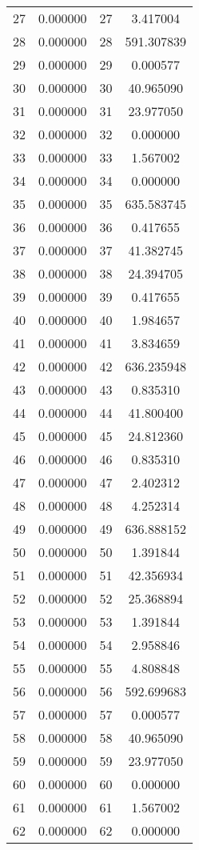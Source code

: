\documentclass[12pt]{article}
\begin{document}
\begin{longtable}{@{}cccc@{}}
27 & 0.000000 & 27 & 3.417004 \\
28 & 0.000000 & 28 & 591.307839 \\
29 & 0.000000 & 29 & 0.000577 \\
30 & 0.000000 & 30 & 40.965090 \\
31 & 0.000000 & 31 & 23.977050 \\
32 & 0.000000 & 32 & 0.000000 \\
33 & 0.000000 & 33 & 1.567002 \\
34 & 0.000000 & 34 & 0.000000 \\
35 & 0.000000 & 35 & 635.583745 \\
36 & 0.000000 & 36 & 0.417655 \\
37 & 0.000000 & 37 & 41.382745 \\
38 & 0.000000 & 38 & 24.394705 \\
39 & 0.000000 & 39 & 0.417655 \\
40 & 0.000000 & 40 & 1.984657 \\
41 & 0.000000 & 41 & 3.834659 \\
42 & 0.000000 & 42 & 636.235948 \\
43 & 0.000000 & 43 & 0.835310 \\
44 & 0.000000 & 44 & 41.800400 \\
45 & 0.000000 & 45 & 24.812360 \\
46 & 0.000000 & 46 & 0.835310 \\
47 & 0.000000 & 47 & 2.402312 \\
48 & 0.000000 & 48 & 4.252314 \\
49 & 0.000000 & 49 & 636.888152 \\
50 & 0.000000 & 50 & 1.391844 \\
51 & 0.000000 & 51 & 42.356934 \\
52 & 0.000000 & 52 & 25.368894 \\
53 & 0.000000 & 53 & 1.391844 \\
54 & 0.000000 & 54 & 2.958846 \\
55 & 0.000000 & 55 & 4.808848 \\
56 & 0.000000 & 56 & 592.699683 \\
57 & 0.000000 & 57 & 0.000577 \\
58 & 0.000000 & 58 & 40.965090 \\
59 & 0.000000 & 59 & 23.977050 \\
60 & 0.000000 & 60 & 0.000000 \\
61 & 0.000000 & 61 & 1.567002 \\
62 & 0.000000 & 62 & 0.000000 \\

\end{longtable}
\end{document}
